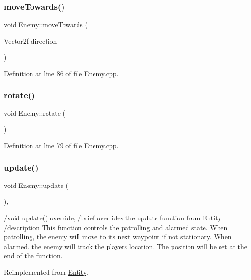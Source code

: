 \subsubsection{\texorpdfstring{move\+Towards()}{moveTowards()}}
{\footnotesize\ttfamily void Enemy\+::move\+Towards (\begin{DoxyParamCaption}\item[{Vector2f}]{direction }\end{DoxyParamCaption})}



Definition at line 86 of file Enemy.\+cpp.

\mbox{\label{class_enemy_aa89bba7f1bb9f16c9cee861137968c30}} 
\subsubsection{\texorpdfstring{rotate()}{rotate()}}
{\footnotesize\ttfamily void Enemy\+::rotate (\begin{DoxyParamCaption}{ }\end{DoxyParamCaption})}



Definition at line 79 of file Enemy.\+cpp.

\mbox{\label{class_enemy_aa70d742da02995011f1618acc9e303db}} 
\subsubsection{\texorpdfstring{update()}{update()}}
{\footnotesize\ttfamily void Enemy\+::update (\begin{DoxyParamCaption}{ }\end{DoxyParamCaption})\hspace{0.3cm}{\ttfamily [override]}, {\ttfamily [virtual]}}

/void \hyperlink{class_enemy_aa70d742da02995011f1618acc9e303db}{update()} override; /brief overrides the update function from \hyperlink{class_entity}{Entity} /description This function controls the patrolling and alarmed state. When patrolling, the enemy will move to it\textquotesingle{}s next waypoint if not stationary. When alarmed, the enemy will track the players location. The position will be set at the end of the function. 

Reimplemented from \hyperlink{class_entity_aed73e98b980b85833428c935cc1c69f8}{Entity}.



